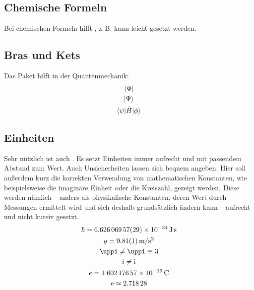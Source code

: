 \subsection{Chemische Formeln}
Bei chemischen Formeln hilft , z.\,B. kann leicht  gesetzt werden.
\subsection{Bras und Kets}
Das Paket  hilft in der Quantenmechanik:
\begin{gather}
 \bra{\Phi}\\
 \ket{\Psi}\\
 \braket{\psi|\hat{H}|\phi}
\end{gather}
\subsection{Einheiten}
Sehr nützlich ist auch . Es setzt Einheiten immer aufrecht und mit passendem Abstand zum Wert. Auch Unsicherheiten lassen sich bequem angeben. Hier soll außerdem kurz die korrekten Verwendung von mathematischen Konstanten, wie beispielsweise die imaginäre Einheit oder die Kreiszahl, gezeigt werden. Diese werden nämlich -- anders als physikalische Konstanten, deren Wert durch Messungen ermittelt wird und sich deshalb grundsätzlich ändern kann -- aufrecht und nicht kursiv gesetzt.
\begin{gather}
 \hbar = \SI[separate-uncertainty=false]{6.62606957(29)e-34}{\joule\second}\\
 g = \SI{9.81(1)}{\meter \per \s^2}\\
 \pi \neq  \uppi \equiv 3\\
 i \neq \i\\
 e = \SI{1.60217657e-19}{\coulomb}\\
 \e \approx \num{2.71828}\\
\end{gather}
